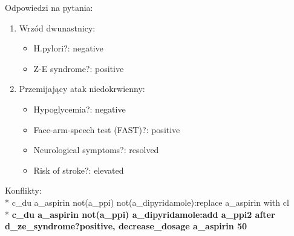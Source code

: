 \newpage
\noindent Odpowiedzi na pytania:
\begin{enumerate}
\item{Wrzód dwunastnicy:
	\begin{itemize}
	\item{H.pylori?: negative}
	\item{Z-E syndrome?: positive}
	\end{itemize}
}
\item{Przemijający atak niedokrwienny:
	\begin{itemize}
	\item{Hypoglycemia?: negative}
	\item{Face-arm-speech test (FAST)?: positive}
	\item{Neurological symptoms?: resolved}
	\item{Risk of stroke?: elevated}
	\end{itemize}
}
\end{enumerate}
Konflikty:\\*
c\_du a\_aspirin not(a\_ppi) not(a\_dipyridamole):replace a\_aspirin with cl\\*
\textbf{c\_du a\_aspirin not(a\_ppi) a\_dipyridamole:add a\_ppi2 after d\_ze\_syndrome?positive, decrease\_dosage a\_aspirin 50}
